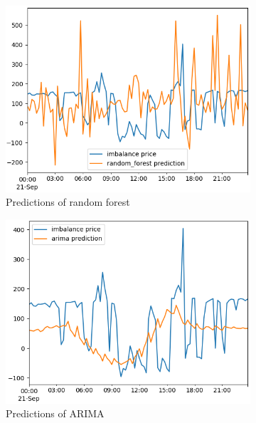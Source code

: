 \documentclass[class=scrbook, crop=false]{standalone}
\begin{document}
\begin{figure}
  \centering
\begin{subfigure}{0.45\textwidth}
  \includegraphics[width=\linewidth]{../images/results/random_forest_prediction.png}
  \caption{Predictions of random forest}
  \label{fig:sfig1}
\end{subfigure}
\begin{subfigure}{0.45\textwidth}
  \includegraphics[width=\linewidth]{../images/results/arima_prediction.png}
  \caption{Predictions of ARIMA}
  \label{fig:sfig1}
\end{subfigure}
\begin{subfigure}{0.45\textwidth}

\end{subfigure}
\end{figure}
\end{document}
